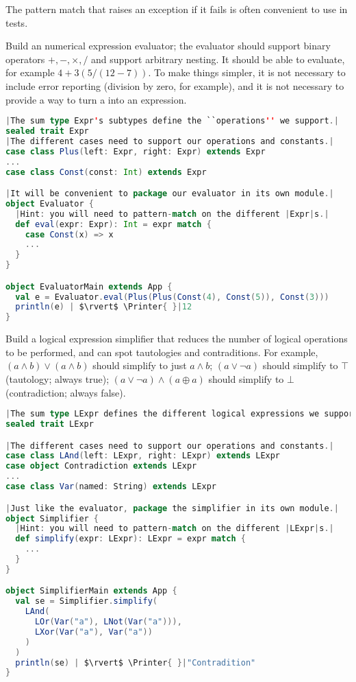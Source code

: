 \documentclass[10 pt]{article}
\begin{document}
The pattern match that raises an exception if it fails is often convenient to use in tests. 


\begin{example}
Build an numerical expression evaluator; the evaluator should support binary operators $+, -, \times, /$ and support arbitrary nesting. It should be able to evaluate, for example $4+3(5/(12-7))$. To make things simpler, it is not necessary to include error reporting (division by zero, for example), and it is not necessary to provide a way to turn a  into an expression.

\begin{lstlisting}[caption={Expression evaluator}, label={code:ee}, language=Scala, escapechar=|]
|The sum type Expr's subtypes define the ``operations'' we support.|
sealed trait Expr
|The different cases need to support our operations and constants.|
case class Plus(left: Expr, right: Expr) extends Expr
...
case class Const(const: Int) extends Expr

|It will be convenient to package our evaluator in its own module.|
object Evaluator {
  |Hint: you will need to pattern-match on the different |Expr|s.|
  def eval(expr: Expr): Int = expr match {
    case Const(x) => x
    ...
  }
}

object EvaluatorMain extends App {
  val e = Evaluator.eval(Plus(Plus(Const(4), Const(5)), Const(3)))
  println(e) | $\rvert$ \Printer{ }|12
}
\end{lstlisting}
\end{example}

\begin{example}
Build a logical expression simplifier that reduces the number of logical operations to be performed, and can spot tautologies and contraditions. For example, $(a \land b) \lor (a \land b)$ should simplify to just $a \land b$; $(a \lor \lnot{a})$ should simplify to $\top$ (tautology; always true); $(a \lor \lnot{a}) \land (a \oplus a)$ should simplify to $\bot$ (contradiction; always false).

\begin{lstlisting}[caption={Logical expression simplifier}, label={code:ls}, language=Scala, escapechar=|]
|The sum type LExpr defines the different logical expressions we support.|
sealed trait LExpr

|The different cases need to support our operations and constants.|
case class LAnd(left: LExpr, right: LExpr) extends LExpr
case object Contradiction extends LExpr
...
case class Var(named: String) extends LExpr

|Just like the evaluator, package the simplifier in its own module.|
object Simplifier {
  |Hint: you will need to pattern-match on the different |LExpr|s.|
  def simplify(expr: LExpr): LExpr = expr match {
    ...
  }
}

object SimplifierMain extends App {
  val se = Simplifier.simplify(
    LAnd(
      LOr(Var("a"), LNot(Var("a"))),
      LXor(Var("a"), Var("a"))
    )
  )
  println(se) | $\rvert$ \Printer{ }|"Contradition"
}
\end{lstlisting}
\end{example}
\end{document}
